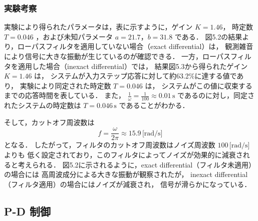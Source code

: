 \newpage

\subsubsection{実験考察}

実験により得られたパラメータは，表に示すように，ゲイン \( K = 1.46 \)，
時定数 \( T = 0.046 \) ，および未知パラメータ \( a = 21.7 \)，\( b = 31.8 \) である．
図5.2の結果より，ローパスフィルタを適用していない場合（exact differential）は，
観測雑音により信号に大きな振動が生じているのが確認できる．
一方，ローパスフィルタを適用した場合（inexact differential）では，
結果図5.3から得られたゲイン \( K = 1.46 \) は，
システムが入力ステップ応答に対して約63.2\%に達する値であり，
実験により同定された時定数 \( T = 0.046 \) は，
システムがこの値に収束するまでの応答時間を表している．
また， \( \frac{1}{\omega} = \frac{1}{100} \approx 0.01 \, 
\text{s} \) であるのに対し，同定されたシステムの時定数は \( T = 0.046 \, \text{s} \)
であることがわかる．

そして，カットオフ周波数は
\[
  f = \frac{\omega}{2 \pi} \approx 15.9 \, \text{[rad/s]}
\]
となる．
したがって，フィルタのカットオフ周波数はノイズ周波数 \( 100 \, \text{[rad/s]} \) よりも
低く設定されており，このフィルタによってノイズが効果的に減衰されると考えられる．
図5.2に示されるように，exact differential（フィルタ未適用）の場合には
高周波成分による大きな振動が観察されたが，
inexact differential（フィルタ適用）の場合にはノイズが減衰され，
信号が滑らかになっている．


\subsection{P-D 制御}

